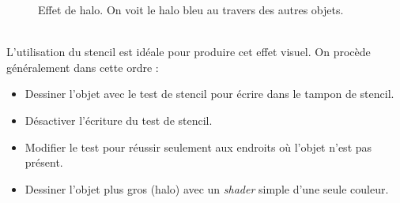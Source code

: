 \documentclass{article}[letterpaper, 11pt]
\begin{document}
\begin{figure}[h]
\begin{minipage}[c]{.49\linewidth}
	\end{minipage}
		 \caption{ \centering Effet de halo. On voit le halo bleu au travers des autres objets.}
\end{figure}\\
L'utilisation du stencil est idéale pour produire cet effet visuel. On procède généralement dans cette
ordre :
\begin{itemize}[label={--}]
	\item Dessiner l'objet avec le test de stencil pour écrire dans le tampon de stencil.
	\item Désactiver l'écriture du test de stencil.
	\item Modifier le test pour réussir seulement aux endroits où l'objet n'est pas présent.
	\item Dessiner l'objet plus gros (halo) avec un \textit{shader} simple d'une seule couleur.
\end{itemize}
\end{document}
